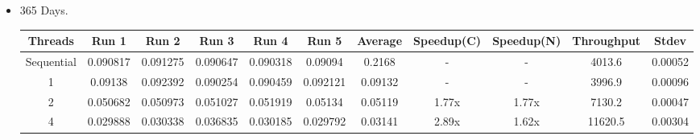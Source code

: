 \documentclass{article}
\begin{document}
\begin{itemize}
    \item 365 Days.
    \begin{center}
    \begin{adjustbox}{width=\columnwidth,center}
    \begin{tabular}{||c | c c c c c | c | c c | c c ||} 
    \hline
    Threads & Run 1 & Run 2 & Run 3 & Run 4 & Run 5 & Average & Speedup(C) & Speedup(N) & Throughput & Stdev \\ [0.5ex] 
    \hline\hline
    Sequential & 0.090817 & 0.091275 & 0.090647 & 0.090318 & 0.09094 & 0.2168 & - & - & 4013.6  & 0.00052\\ 
    \hline
    1 & 0.09138 & 0.092392 & 0.090254 & 0.090459 & 0.092121 & 0.09132 & - & - & 3996.9 & 0.00096\\ 
    \hline
    2 & 0.050682 & 0.050973 & 0.051027 & 0.051919 & 0.05134 & 0.05119 & 1.77x & 1.77x & 7130.2 & 0.00047\\ 
    \hline
    4 & 0.029888 & 0.030338 & 0.036835 & 0.030185 & 0.029792 & 0.03141 &  2.89x & 1.62x & 11620.5 & 0.00304\\ 
    \hline
    \end{tabular}
    \end{adjustbox}
    \end{center}
\end{itemize}    
\end{document}
